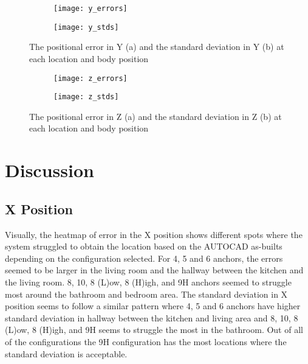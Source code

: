 \begin{figure}[ht]
    \centering
    \begin{subfigure}[b]{\textwidth}
        \centering
        \texttt{[image: y\_errors]}
        \caption{}
    \end{subfigure}
    \begin{subfigure}[b]{\textwidth}
        \centering
        \texttt{[image: y\_stds]}
        \caption{}
    \end{subfigure}
    \caption{The positional error in Y (a) and the standard deviation in Y (b) at each location
    and body position}
    \label{fig:yposstats}
\end{figure}

\begin{figure}[ht]
    \centering
    \begin{subfigure}[b]{\textwidth}
        \centering
        \texttt{[image: z\_errors]}
        \caption{}
    \end{subfigure}
    \begin{subfigure}[b]{\textwidth}
        \centering
        \texttt{[image: z\_stds]}
        \caption{}
    \end{subfigure}
    \caption{The positional error in Z (a) and the standard deviation in Z (b) at each location
    and body position}
    \label{fig:zposstats}
\end{figure}

\clearpage
\section{Discussion}

\subsection{X Position}
Visually, the heatmap of error in the X position shows different spots 
where the system struggled to obtain the location based on the AUTOCAD as-builts 
depending on the configuration selected.
For 4, 5 and 6 anchors, the errors seemed to be larger in the living room
and the hallway between the kitchen and the living room. 8, 10, 8 (L)ow, 8 (H)igh, and 9H
anchors seemed to struggle most around the bathroom and bedroom area. 
The standard deviation in X position seems to follow a similar pattern where 
4, 5 and 6 anchors have higher standard deviation in hallway between the kitchen and living
area and 8, 10, 8 (L)ow, 8 (H)igh, and 9H seems to struggle the most in the bathroom.
Out of all of the configurations the 9H configuration has the most locations
where the standard deviation is acceptable.

